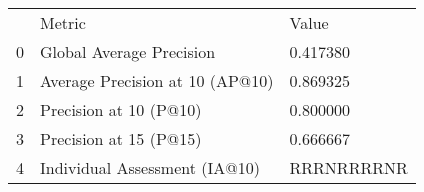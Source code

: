 \begin{tabular}{lll}
 & Metric & Value \\
0 & Global Average Precision & 0.417380 \\
1 & Average Precision at 10 (AP@10) & 0.869325 \\
2 & Precision at 10 (P@10) & 0.800000 \\
3 & Precision at 15 (P@15) & 0.666667 \\
4 & Individual Assessment (IA@10) & RRRNRRRRNR \\
\end{tabular}
